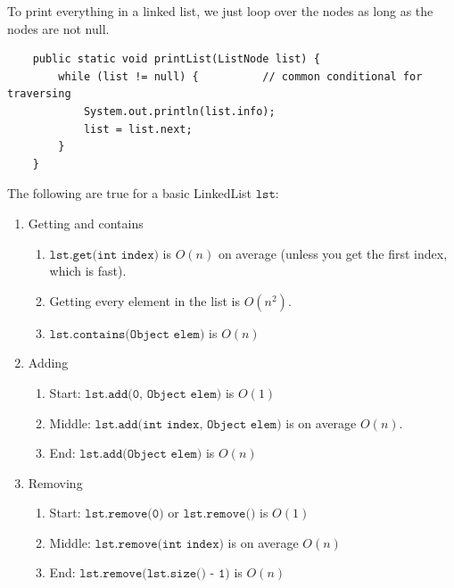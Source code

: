 \documentclass{article}
\begin{document}
    To print everything in a linked list, we just loop over the nodes as long as the nodes are not null. 
    \begin{lstlisting}
    public static void printList(ListNode list) {
        while (list != null) {          // common conditional for traversing 
            System.out.println(list.info); 
            list = list.next; 
        }
    }
    \end{lstlisting}

    \begin{theorem}
    The following are true for a basic LinkedList $\texttt{lst}$:  
    \begin{enumerate}
        \item Getting and contains 
        \begin{enumerate}
            \item $\texttt{lst.get(int index)}$ is $O(n)$ on average (unless you get the first index, which is fast).  
            \item Getting every element in the list is $O(n^2)$. 
            \item $\texttt{lst.contains(Object elem)}$ is $O(n)$ 
        \end{enumerate}
        
        \item Adding 
        \begin{enumerate}
            \item Start:  $\texttt{lst.add(0, Object elem)}$ is $O(1)$ 
            \item Middle: $\texttt{lst.add(int index, Object elem)}$ is on average $O(n)$. 
            \item End:    $\texttt{lst.add(Object elem)}$ is $O(n)$
        \end{enumerate}
        
        \item Removing 
        \begin{enumerate}
            \item Start:  $\texttt{lst.remove(0)}$ or $\texttt{lst.remove()}$ is $O(1)$ 
            \item Middle: $\texttt{lst.remove(int index)}$ is on average $O(n)$ 
            \item End:    $\texttt{lst.remove(lst.size() - 1)}$ is $O(n)$ 
        \end{enumerate}
    \end{enumerate}
    \end{theorem}
\end{document}
